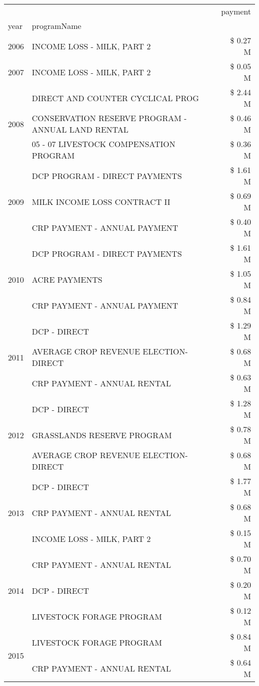 \begin{tabular}{llr}
\toprule
 &  & payment \\
year & programName &  \\
\midrule
2006 & INCOME LOSS - MILK, PART 2 & \$ 0.27 M \\
\cline{1-3}
2007 & INCOME LOSS - MILK, PART 2 & \$ 0.05 M \\
\cline{1-3}
\multirow[t]{3}{*}{2008} & DIRECT AND COUNTER CYCLICAL PROG & \$ 2.44 M \\
 & CONSERVATION RESERVE PROGRAM - ANNUAL LAND RENTAL & \$ 0.46 M \\
 & 05 - 07 LIVESTOCK COMPENSATION PROGRAM & \$ 0.36 M \\
\cline{1-3}
\multirow[t]{3}{*}{2009} & DCP PROGRAM - DIRECT PAYMENTS & \$ 1.61 M \\
 & MILK INCOME LOSS CONTRACT II & \$ 0.69 M \\
 & CRP PAYMENT - ANNUAL PAYMENT & \$ 0.40 M \\
\cline{1-3}
\multirow[t]{3}{*}{2010} & DCP PROGRAM - DIRECT PAYMENTS & \$ 1.61 M \\
 & ACRE PAYMENTS & \$ 1.05 M \\
 & CRP PAYMENT - ANNUAL PAYMENT & \$ 0.84 M \\
\cline{1-3}
\multirow[t]{3}{*}{2011} & DCP - DIRECT & \$ 1.29 M \\
 & AVERAGE CROP REVENUE ELECTION-DIRECT & \$ 0.68 M \\
 & CRP PAYMENT - ANNUAL RENTAL & \$ 0.63 M \\
\cline{1-3}
\multirow[t]{3}{*}{2012} & DCP - DIRECT & \$ 1.28 M \\
 & GRASSLANDS RESERVE PROGRAM & \$ 0.78 M \\
 & AVERAGE CROP REVENUE ELECTION-DIRECT & \$ 0.68 M \\
\cline{1-3}
\multirow[t]{3}{*}{2013} & DCP - DIRECT & \$ 1.77 M \\
 & CRP PAYMENT - ANNUAL RENTAL & \$ 0.68 M \\
 & INCOME LOSS - MILK, PART 2 & \$ 0.15 M \\
\cline{1-3}
\multirow[t]{3}{*}{2014} & CRP PAYMENT - ANNUAL RENTAL & \$ 0.70 M \\
 & DCP - DIRECT & \$ 0.20 M \\
 & LIVESTOCK FORAGE PROGRAM & \$ 0.12 M \\
\cline{1-3}
\multirow[t]{3}{*}{2015} & LIVESTOCK FORAGE PROGRAM & \$ 0.84 M \\
 & CRP PAYMENT - ANNUAL RENTAL & \$ 0.64 M \\

\end{tabular}
